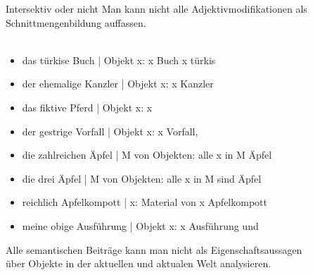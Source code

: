 \begin{frame}
  {Intersektiv oder nicht}
  \onslide<+->
  \onslide<+->
  Man kann nicht alle Adjektivmodifikationen als Schnittmengenbildung auffassen.\\
  \\
  \Zeile
  \begin{itemize}[<+->]\small
    \item \alert{das türkise Buch} | Objekt x: x  Buch  x  türkis
      \Halbzeile
    \item \alert{der ehemalige Kanzler} | Objekt x: x  Kanzler 
    \item \alert{das fiktive Pferd} | Objekt x: x 
    \item \alert{der gestrige Vorfall} | Objekt x: x  Vorfall, 
    \item \alert{die zahlreichen Äpfel} |  M von Objekten: alle x in M  Äpfel
    \item \alert{die drei Äpfel} |  M von Objekten: alle x in M sind Äpfel
    \item \alert{reichlich Apfelkompott} |  x: Material von x  Apfelkompott
    \item \alert{meine obige Ausführung} | Objekt x: x  Ausführung   und 
  \end{itemize}
  \onslide<+->
  \Halbzeile
  \centering 
  Alle  semantischen Beiträge kann man nicht als Eigenschaftsaussagen\\
  über Objekte in der aktuellen und aktualen Welt analysieren.
\end{frame}

